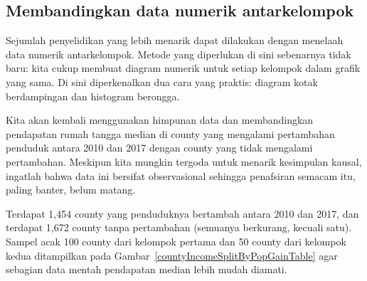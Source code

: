 

\D{\newpage}

\subsection{Membandingkan data numerik antarkelompok}
\label{comparingAcrossGroups}


Sejumlah penyelidikan yang lebih menarik dapat dilakukan
dengan menelaah data numerik antarkelompok.
Metode yang diperlukan di sini sebenarnya tidak baru:
kita cukup membuat diagram numerik untuk setiap kelompok
dalam grafik yang sama.
Di sini diperkenalkan dua cara yang praktis:
diagram kotak berdampingan dan histogram berongga.

Kita akan kembali menggunakan himpunan data 
dan membandingkan pendapatan rumah tangga median di county
yang mengalami pertambahan penduduk antara 2010 dan 2017
dengan county yang tidak mengalami pertambahan.
Meskipun kita mungkin tergoda untuk menarik kesimpulan kausal,
ingatlah bahwa data ini bersifat observasional sehingga penafsiran
semacam itu, paling banter, belum matang.

\newcommand{\numcountieswithgains}{1454}
\newcommand{\numcountieswithgainsC}{1,454}
\newcommand{\numcountieswithoutgains}{1672}
\newcommand{\numcountieswithoutgainsC}{1,672}

Terdapat \numcountieswithgainsC{} county yang penduduknya
bertambah antara 2010 dan 2017, dan terdapat
\numcountieswithoutgainsC{} county tanpa pertambahan
(semuanya berkurang, kecuali satu).
Sampel acak 100 county dari kelompok pertama dan
50 county dari kelompok kedua ditampilkan pada
Gambar~\ref{countyIncomeSplitByPopGainTable}
agar sebagian data mentah pendapatan median
lebih mudah diamati.

